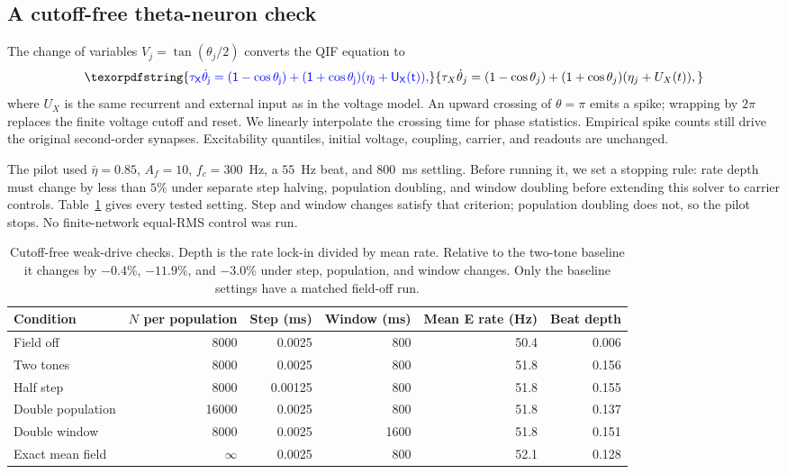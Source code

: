 \documentclass[11pt,a4paper]{article}
\newif\ifjne
\providecommand{\DIFaddtex}[1]{{\protect\color{blue} \sf #1}} %
\providecommand{\DIFadd}[1]{\texorpdfstring{\DIFaddtex{#1}}{#1}} %
\begin{document}
\ifjne
\subsection{\DIFadd{A cutoff-free theta-neuron check}}\label{supp:theta-pilot}
\DIFadd{The change of variables $V_j=\tan(\theta_j/2)$ converts the QIF equation to
}\[
\DIFadd{\tau_X\dot\theta_j=(1-\cos\theta_j)
 +(1+\cos\theta_j)(\eta_j+U_X(t)),
}\]
\DIFadd{where $U_X$ is the same recurrent and external input as in the voltage model.
An upward crossing of $\theta=\pi$ emits a spike; wrapping by $2\pi$ replaces
the finite voltage cutoff and reset. We linearly interpolate the crossing
time for phase statistics. Empirical spike counts still drive the original
second-order synapses. Excitability quantiles, initial voltage, coupling,
carrier, and readouts are unchanged.
}

\DIFadd{The pilot used $\bar\eta=0.85$, $A_f=10$, $f_c=300$~Hz, a $55$~Hz beat,
and $800$~ms settling. Before running it, we set a stopping rule: rate depth
must change by less than $5\%$ under separate step halving, population
doubling, and window doubling before extending this solver to carrier controls.
Table~\ref{tab:theta-pilot} gives every tested setting. Step and window changes
satisfy that criterion; population doubling does not, so the pilot stops.
No finite-network equal-RMS control was run.
}

\begin{table}[htbp]
\color{blue}
\centering\small
\begin{tabular}{@{}lrrrrr@{}}
\toprule
Condition & $N$ per population & Step (ms) & Window (ms) & Mean E rate (Hz) & Beat depth\\
\midrule
Field off & 8000 & 0.0025 & 800 & 50.4 & 0.006\\
Two tones & 8000 & 0.0025 & 800 & 51.8 & 0.156\\
Half step & 8000 & 0.00125 & 800 & 51.8 & 0.155\\
Double population & 16000 & 0.0025 & 800 & 51.8 & 0.137\\
Double window & 8000 & 0.0025 & 1600 & 51.8 & 0.151\\
Exact mean field & $\infty$ & 0.0025 & 800 & 52.1 & 0.128\\
\bottomrule
\end{tabular}
\caption{\color{blue}Cutoff-free weak-drive checks. Depth is the rate lock-in divided by
mean rate. Relative to the two-tone baseline it changes by $-0.4\%$,
$-11.9\%$, and $-3.0\%$ under step, population, and window changes.
Only the baseline settings have a matched field-off run.}
\label{tab:theta-pilot}
\end{table}
\end{document}
